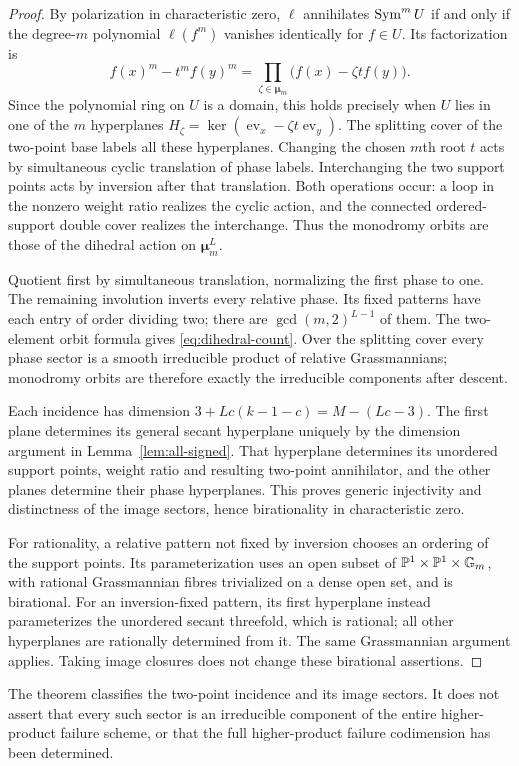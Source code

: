 \begin{proof}
By polarization in characteristic zero, $\ell$ annihilates
$\operatorname{Sym}^mU$ if and only if the degree-$m$ polynomial $\ell(f^m)$
vanishes identically for $f\in U$. Its factorization is
\[
 f(x)^m-t^mf(y)^m
 =\prod_{\zeta\in\boldsymbol\mu_m}
                \bigl(f(x)-\zeta t f(y)\bigr).
\]
Since the polynomial ring on $U$ is a domain, this holds precisely when
$U$ lies in one of the $m$ hyperplanes
$H_\zeta=\ker(\operatorname{ev}_x-\zeta t\operatorname{ev}_y)$.
The splitting cover of the two-point base labels all these hyperplanes.
Changing the chosen $m$th root $t$ acts by simultaneous cyclic
translation of phase labels. Interchanging the two support points acts
by inversion after that translation. Both operations occur: a loop in
the nonzero weight ratio realizes the cyclic action, and the connected
ordered-support double cover realizes the interchange. Thus the
monodromy orbits are those of the dihedral action on
$\boldsymbol\mu_m^L$.

Quotient first by simultaneous translation, normalizing the first phase
to one. The remaining involution inverts every relative phase. Its fixed
patterns have each entry of order dividing two; there are
$\gcd(m,2)^{L-1}$ of them. The two-element orbit formula gives
\eqref{eq:dihedral-count}. Over the splitting cover every phase sector
is a smooth irreducible product of relative Grassmannians; monodromy
orbits are therefore exactly the irreducible components after descent.

Each incidence has dimension $3+Lc(k-1-c)=M-(Lc-3)$.
The first plane determines its general secant hyperplane uniquely by
the dimension argument in Lemma~\ref{lem:all-signed}. That hyperplane
determines its unordered support points, weight ratio and resulting
two-point annihilator, and the other planes determine their phase
hyperplanes. This proves generic injectivity and distinctness of the
image sectors, hence birationality in characteristic zero.

For rationality, a relative pattern not fixed by inversion chooses an
ordering of the support points. Its parameterization uses an open
subset of $\mathbb P^1\times\mathbb P^1\times\mathbb G_m$, with rational
Grassmannian fibres trivialized on a dense open set, and is birational.
For an inversion-fixed pattern, its first hyperplane instead
parameterizes the unordered secant threefold, which is rational; all
other hyperplanes are rationally determined from it. The same
Grassmannian argument applies. Taking image closures does not change
these birational assertions.
\end{proof}
The theorem classifies the two-point incidence and its image sectors.
It does not assert that every such sector is an irreducible component
of the entire higher-product failure scheme, or that the full
higher-product failure codimension has been determined.

